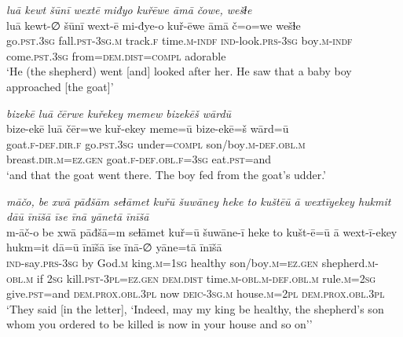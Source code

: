 \ea \label{KŠ.30}
\textit{luā kewt šūnī wextē miđyo kuřēwe āmā čowe, wešɫe} \\ 
\gll luā kewt-∅ šūnī wext-ē mi-đye-o kuř-ēwe āmā č=o=we wešɫe \\ 
 go\textsc{.pst}\textsc{.3sg} fall\textsc{.pst}\textsc{-3sg}\textsc{.m} track\textsc{.f} time\textsc{.m}\textsc{-indf} \textsc{ind-}look\textsc{.prs}\textsc{-3sg} boy\textsc{.m}\textsc{-indf} come\textsc{.pst}\textsc{.3sg} from=\textsc{dem.dist}\textsc{=compl} adorable \\ 
\glt `He (the shepherd) went [and] looked after her. He saw that a baby boy approached [the goat]'
\z 
 
\ea \label{KŠ.31}
\textit{bizekē luā čērwe kuřekey memew bizekēš wārdū} \\ 
\gll bize-ekē luā čēr=we kuř-ekey meme=ū bize-ekē=š wārd=ū \\ 
 goat\textsc{.f}\textsc{-def}\textsc{.dir}\textsc{.f} go\textsc{.pst}\textsc{.3sg} under\textsc{=compl} son/boy\textsc{.m}\textsc{-def}\textsc{.obl}\textsc{.m} breast\textsc{.dir}\textsc{.m}\textsc{=ez.gen} goat\textsc{.f}\textsc{-def}\textsc{.obl}\textsc{.f}\textsc{=3sg} eat\textsc{.pst}=and \\ 
\glt `and that the goat went there. The boy fed from the goat’s udder.'
\z 
 
\ea \label{KŠ.51}
\textit{māčo, be xwā pāđšām seɫāmet kuřū šuwāney heke to kuštēū ā wextīyekey hukmit dāū īnīšā īse īnā yānetā īnīšā} \\ 
\gll m-āč-o be xwā pāđšā=m seɫāmet kuř=ū šuwāne-ī heke to kušt-ē=ū ā wext-ī-ekey hukm=it dā=ū īnīšā īse īnā-∅ yāne=tā īnīšā \\ 
 \textsc{ind-}say\textsc{.prs}\textsc{-3sg} by God\textsc{.m} king\textsc{.m}\textsc{=\textsc{1sg}} healthy son/boy\textsc{.m}\textsc{=ez.gen} shepherd\textsc{.m}\textsc{-obl}\textsc{.m} if \textsc{2sg} kill\textsc{.pst}\textsc{-3pl}\textsc{=ez.gen} \textsc{dem.dist} time\textsc{.m}\textsc{-obl}\textsc{.m}\textsc{-def}\textsc{.obl}\textsc{.m} rule\textsc{.m}\textsc{=\textsc{2sg}} give\textsc{.pst}=and \textsc{dem.prox}\textsc{.obl}\textsc{.3pl} now \textsc{deic}\textsc{-3sg}\textsc{.m} house\textsc{.m}=\textsc{2pl} \textsc{dem.prox}\textsc{.obl}\textsc{.3pl} \\ 
\glt `They said [in the letter], ‘Indeed, may my king be healthy, the shepherd’s son whom you ordered to be killed is now in your house and so on’'
\z 
 

